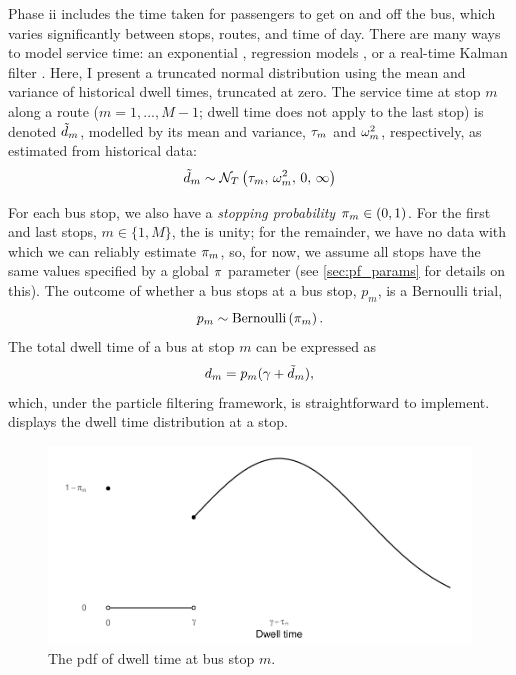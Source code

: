 Phase ii includes the time taken for passengers to get on and off the bus, which varies significantly between stops, routes, and time of day. There are many ways to model service time: an exponential \citep{Hans_2015}, regression models \citep{Shen_2013}, or a real-time Kalman filter \citep{Shalaby_2004}. Here, I present a truncated normal distribution using the mean and variance of historical dwell times, truncated at zero. The service time at stop $m$ along a route ($m=1,...,M-1$; dwell time does not apply to the last stop) is denoted $\tilde d_m$, modelled by its mean and variance, $\tau_m$ and $\omega^2_m$, respectively, as estimated from historical data:
\begin{equation}
\label{eq:stop_dwell_time}
\tilde d_m \sim \mathcal{N}_T\left(\tau_m,\, \omega^2_m,\, 0,\, \infty\right)
\end{equation}

For each bus stop, we also have a \emph{stopping probability} $\pi_m\in(0,1)$. For the first and last stops, $m\in\{1,M\}$, the is unity; for the remainder, we have no data with which we can reliably estimate $\pi_m$, so, for now, we assume all stops have the same values specified by a global $\pi$ parameter (see \cref{sec:pf_params} for details on this). The outcome of whether a bus stops at a bus stop, $p_m$, is a Bernoulli trial,
\begin{equation}
\label{eq:stop_pstop}
p_m \sim \mathrm{Bernoulli}\left(\pi_m\right).
\end{equation}
The total dwell time of a bus at stop $m$ can be expressed as
\begin{equation}
\label{eq:stop_total_dwell_time}
d_m = p_m (\gamma + \tilde d_m),
\end{equation}
which, under the particle filtering framework, is straightforward to implement.  displays the dwell time distribution at a stop.


\begin{knitrout}\small
{}\color{fgcolor}\begin{figure}

{\centering \includegraphics[width=.8\textwidth]{figure/eta_dwell_times-1} 

}

\caption[The \gls{pdf} of dwell time at a stop]{The \gls{pdf} of dwell time at bus stop $m$.}\label{fig:eta_dwell_times}
\end{figure}


\end{knitrout}


